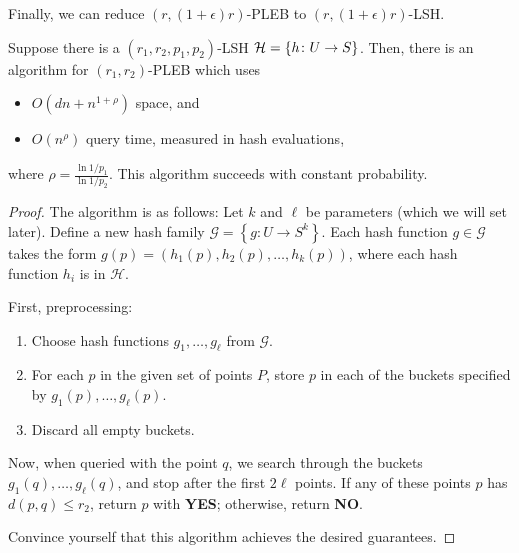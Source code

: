 \documentclass{article}
\begin{document}
Finally, we can reduce $(r, (1 + \epsilon) r)$-PLEB to $(r, (1 + \epsilon) r)$-LSH.

\begin{lemma}
  Suppose there is a $(r_1, r_2, p_1, p_2)$-LSH $\mathcal{H} = \{h \colon U \to S\}$.
  Then, there is an algorithm for $(r_1, r_2)$-PLEB which uses
  \begin{itemize}
    \item $O(dn + n^{1 + \rho})$ space, and
    \item $O(n^\rho)$ query time, measured in hash evaluations,
  \end{itemize}
  where $\rho = \frac{\ln 1 / p_1}{\ln 1 / p_2}$.
  This algorithm succeeds with constant probability.
\end{lemma}

\begin{proof}
  The algorithm is as follows:
  Let $k$ and $\ell$ be parameters (which we will set later). Define a new hash family $\mathcal{G}=\left\{g: U \rightarrow S^k\right\}$. Each hash function $g \in \mathcal{G}$ takes the form $g(p)=\left(h_1(p), h_2(p), \ldots, h_k(p)\right)$, where each hash function $h_i$ is in $\mathcal{H}$.

  First, preprocessing:
  \begin{enumerate}
    \item Choose hash functions $g_1, \ldots, g_{\ell}$ from $\mathcal{G}$.
    \item For each $p$ in the given set of points $P$, store $p$ in each of the buckets specified by $g_1(p), \ldots, g_{\ell}(p)$.
    \item Discard all empty buckets.
  \end{enumerate}

  Now, when queried with the point $q$, we search through the buckets $g_1(q), \ldots, g_{\ell}(q)$, and stop after the first $2 \ell$ points. If any of these points $p$ has $d(p, q) \leq r_2$, return $p$ with \textbf{YES}; otherwise, return \textbf{NO}.

  Convince yourself that this algorithm achieves the desired guarantees.
\end{proof}
\end{document}
